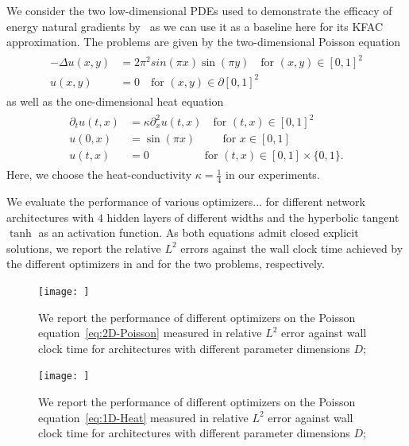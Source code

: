We consider the two low-dimensional PDEs used to demonstrate the efficacy of energy natural gradients by~\cite{muller2023achieving}
as we can use it as a baseline here for its KFAC approximation. 
The problems are given by the two-dimensional Poisson equation 
\begin{align}\label{eq:2D-Poisson}
    \begin{split}
        -\Delta u(x,y) & = 2\pi^2 sin(\pi x) \sin(\pi y) \quad \text{for } (x,y)\in[0,1]^2 \\ 
    u(x,y) & = 0 \quad \text{for } (x,y) \in\partial[0,1]^2
    \end{split}
\end{align}
as well as the one-dimensional heat equation 
\begin{align}\label{eq:1D-Heat}
    \begin{split}
        \partial_t u(t,x) &= \kappa\partial_x^2u(t,x) \quad \text{for }(t,x)\in[0,1]^2
        \\
        u(0,x) &= \sin(\pi x) \qquad\;\, \text{for }x\in[0,1]
        \\
        u(t,x) &= 0 \qquad\qquad\quad\text{for }(t,x)\in[0,1]\times\{0,1\}.
    \end{split}
\end{align}
Here, we choose the heat-conductivity $\kappa = \frac14$ in our experiments. 

We evaluate the performance of various optimizers... for different network architectures with $4$ hidden layers of different widths and the hyperbolic tangent $\tanh$ as an activation function. 
As both equations admit closed explicit solutions, we report the relative $L^2$ errors against the wall clock time achieved by the different optimizers in  and  for the two problems, respectively. 

\begin{figure}
    \centering
    \texttt{[image: ]}
    \caption{We report the performance of different optimizers on the Poisson equation~\eqref{eq:2D-Poisson} measured in relative $L^2$ error against wall clock time for architectures with different parameter dimensions $D$; }
    \label{fig:2D-Poisson}
\end{figure}

\begin{figure}
    \centering
    \texttt{[image: ]}
    \caption{We report the performance of different optimizers on the Poisson equation~\eqref{eq:1D-Heat} measured in relative $L^2$ error against wall clock time for architectures with different parameter dimensions $D$; }
    \label{fig:1D-heat}
\end{figure}


